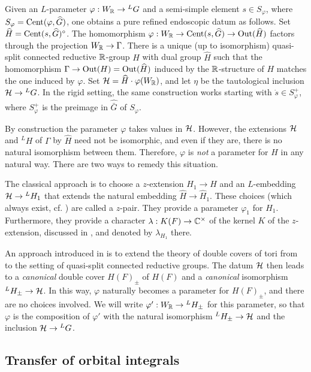 \documentclass{article}
\theoremstyle{definition}
\numberwithin{equation}{section}
\renewcommand{\-}{\hyp{}}
\begin{document}
Given an $L$\-parameter $\varphi : W_{\mathbb{R}} \to {^LG}$ and a semi-simple element $s \in S_\varphi$, where $S_\varphi=\textrm{Cent}(\varphi,\widehat G)$, one obtains a pure refined endoscopic datum as follows. Set $\widehat H = \textrm{Cent}(s,\widehat G)^\circ$. The homomorphism  $\varphi : W_{\mathbb{R}} \to \textrm{Cent}(s,\widehat G) \to \textrm{Out}(\widehat H)$ factors through the projection $W_{\mathbb{R}} \to \Gamma$. There is a unique (up to isomorphism) quasi-split connected reductive $\mathbb{R}$-group $H$ with dual group $\hat H$ such that the homomorphism $\Gamma \to \textrm{Out}(H)=\textrm{Out}(\widehat H)$ induced by the $\mathbb{R}$-structure of $H$ matches the one induced by $\varphi$. Set $\mathcal{H}=\widehat H \cdot \varphi(W_{\mathbb{R}})$, and let $\eta$ be the tautological inclusion $\mathcal{H} \to {^LG}$. In the rigid setting, the same construction works starting with $\dot s \in S_\varphi^+$, where $S_\varphi^+$ is the preimage in $\hat{\bar G}$ of $S_\varphi$.  

By construction the parameter $\varphi$ takes values in $\mathcal{H}$. However, the extensions $\mathcal{H}$ and $^LH$ of $\Gamma$ by $\hat H$ need not be isomorphic, and even if they are, there is no natural isomorphism between them. Therefore, $\varphi$ is \emph{not} a parameter for $H$ in any natural way. There are two ways to remedy this situation.

The classical approach is to choose a $z$-extension $H_1 \to H$ and an $L$\-embedding $\mathcal{H} \to {^LH_1}$ that extends the natural embedding $\hat H \to \hat H_1$. These choices (which always exist, cf. \cite[\S2.2]{KS99}) are called a $z$-pair. They provide a parameter $\varphi_1$ for $H_1$. Furthermore, they provide a character $\lambda : K(F) \to \mathbb{C}^\times$ of the kernel $K$ of the $z$-extension, discussed in \cite[\S2.2, page 23]{KS99}, and denoted by $\lambda_{H_1}$ there.

An approach introduced in \cite{KalHDC} is to extend the theory of double covers of tori from \cite{KalDC} to the setting of quasi-split connected reductive groups. The datum $\mathcal{H}$ then leads to a \emph{canonical} double cover $H(F)_\pm$ of $H(F)$ and a \emph{canonical} isomorphism $^LH_\pm \to \mathcal{H}$. In this way, $\varphi$ naturally becomes a parameter for $H(F)_\pm$, and there are no choices involved. We will write $\varphi' : W_{\mathbb{R}} \to {^LH_\pm}$ for this parameter, so that $\varphi$ is the composition of $\varphi'$ with the natural isomorphism $^LH_\pm \to \mathcal{H}$ and the inclusion $\mathcal{H} \to {^LG}$.


\subsection{Transfer of orbital integrals} \label{sub:transfer}
\end{document}

